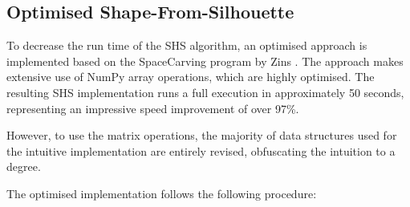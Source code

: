 \newpage
\subsection{Optimised Shape-From-Silhouette}

To decrease the run time of the SHS algorithm, an optimised approach is implemented based on the SpaceCarving program by Zins \cite{zins_2019}. The approach makes extensive use of NumPy array operations, which are highly optimised. The resulting SHS implementation runs a full execution in approximately 50 seconds, representing an impressive speed improvement of over 97\%.

However, to use the matrix operations, the majority of data structures used for the intuitive implementation are entirely revised, obfuscating the intuition to a degree.

The optimised implementation follows the following procedure:

